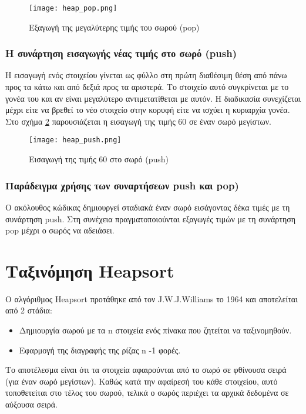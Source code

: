 \begin{figure}[ht!]
\centering
\texttt{[image: heap\_pop.png]}
\caption{Εξαγωγή της μεγαλύτερης τιμής του σωρού (pop)}
\label{fig:heap_pop}
\end{figure}

\subsubsection*{Η συνάρτηση εισαγωγής νέας τιμής στο σωρό (push)}
Η εισαγωγή ενός στοιχείου γίνεται ως φύλλο στη πρώτη διαθέσιμη θέση από πάνω προς τα κάτω και από δεξιά προς τα αριστερά. Το στοιχείο αυτό συγκρίνεται με το γονέα του και αν είναι μεγαλύτερο αντιμετατίθεται με αυτόν. Η διαδικασία συνεχίζεται μέχρι είτε να βρεθεί το νέο στοιχείο στην κορυφή είτε να ισχύει η κυριαρχία γονέα. Στο σχήμα \ref{fig:heap_push} παρουσιάζεται η εισαγωγή της τιμής 60 σε έναν σωρό μεγίστων.

\begin{figure}[H]
\centering
\texttt{[image: heap\_push.png]}
\caption{Εισαγωγή της τιμής 60 στο σωρό (push)}
\label{fig:heap_push}
\end{figure}


\subsubsection*{Παράδειγμα χρήσης των συναρτήσεων push και pop)}
Ο ακόλουθος κώδικας δημιουργεί σταδιακά έναν σωρό εισάγοντας δέκα τιμές με τη συνάρτηση push. Στη συνέχεια πραγματοποιούνται εξαγωγές τιμών με τη συνάρτηση pop μέχρι ο σωρός να αδειάσει.






\section{Ταξινόμηση Heapsort}
Ο αλγόριθμος Heapsort προτάθηκε από τον J.W.J.Williams το 1964 \cite{nist_heapsort} και αποτελείται από 2 στάδια:
\begin{itemize}[noitemsep]
\item Δημιουργία σωρού με τα n στοιχεία ενός πίνακα που ζητείται να ταξινομηθούν. 
\item Εφαρμογή της διαγραφής της ρίζας n -1 φορές.
\end{itemize}
Το αποτέλεσμα είναι ότι τα στοιχεία αφαιρούνται από το σωρό σε φθίνουσα σειρά (για έναν σωρό μεγίστων). Καθώς κατά την αφαίρεσή του κάθε στοιχείου, αυτό τοποθετείται στο τέλος του σωρού, τελικά ο σωρός περιέχει τα αρχικά δεδομένα σε αύξουσα σειρά. 

